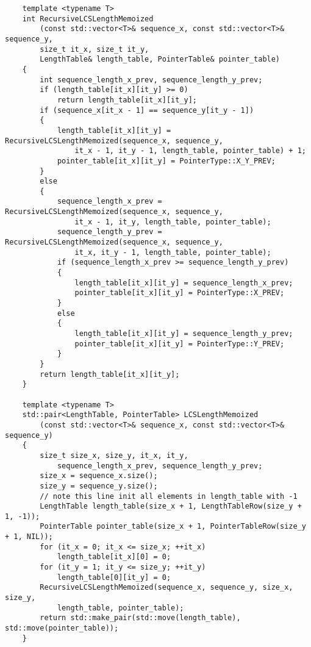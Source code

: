 \begin{verbatim}
    template <typename T>
    int RecursiveLCSLengthMemoized
        (const std::vector<T>& sequence_x, const std::vector<T>& sequence_y, 
        size_t it_x, size_t it_y,
        LengthTable& length_table, PointerTable& pointer_table) 
    {
        int sequence_length_x_prev, sequence_length_y_prev;
        if (length_table[it_x][it_y] >= 0)
            return length_table[it_x][it_y];
        if (sequence_x[it_x - 1] == sequence_y[it_y - 1])
        {
            length_table[it_x][it_y] = RecursiveLCSLengthMemoized(sequence_x, sequence_y, 
                it_x - 1, it_y - 1, length_table, pointer_table) + 1;
            pointer_table[it_x][it_y] = PointerType::X_Y_PREV;
        }
        else
        {
            sequence_length_x_prev = RecursiveLCSLengthMemoized(sequence_x, sequence_y, 
                it_x - 1, it_y, length_table, pointer_table);
            sequence_length_y_prev = RecursiveLCSLengthMemoized(sequence_x, sequence_y, 
                it_x, it_y - 1, length_table, pointer_table);
            if (sequence_length_x_prev >= sequence_length_y_prev) 
            {
                length_table[it_x][it_y] = sequence_length_x_prev;
                pointer_table[it_x][it_y] = PointerType::X_PREV;
            } 
            else 
            {
                length_table[it_x][it_y] = sequence_length_y_prev;
                pointer_table[it_x][it_y] = PointerType::Y_PREV;
            }
        }
        return length_table[it_x][it_y];
    }

    template <typename T>
    std::pair<LengthTable, PointerTable> LCSLengthMemoized
        (const std::vector<T>& sequence_x, const std::vector<T>& sequence_y) 
    {
        size_t size_x, size_y, it_x, it_y, 
            sequence_length_x_prev, sequence_length_y_prev;
        size_x = sequence_x.size();
        size_y = sequence_y.size();
        // note this line init all elements in length_table with -1
        LengthTable length_table(size_x + 1, LengthTableRow(size_y + 1, -1));
        PointerTable pointer_table(size_x + 1, PointerTableRow(size_y + 1, NIL));
        for (it_x = 0; it_x <= size_x; ++it_x)
            length_table[it_x][0] = 0;
        for (it_y = 1; it_y <= size_y; ++it_y)
            length_table[0][it_y] = 0;
        RecursiveLCSLengthMemoized(sequence_x, sequence_y, size_x, size_y, 
            length_table, pointer_table);
        return std::make_pair(std::move(length_table), std::move(pointer_table));
    }
\end{verbatim}

